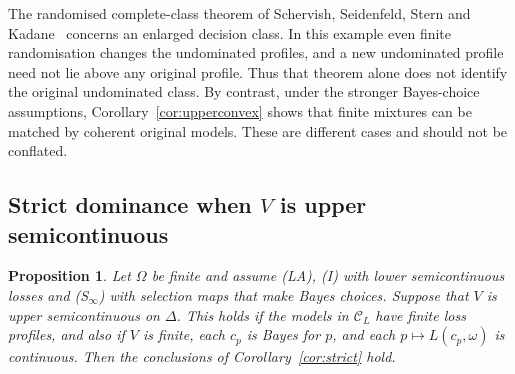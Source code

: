 \documentclass[11pt]{article}
\newtheorem{proposition}[theorem]{Proposition}
\theoremstyle{definition}
\theoremstyle{remark}
\newcommand{\C}{\mathcal C}
\begin{document}
The randomised complete-class theorem of Schervish, Seidenfeld, Stern and Kadane~\cite[Theorem~1]{SSSK} concerns an enlarged decision class. In this example even finite randomisation changes the undominated profiles, and a new undominated profile need not lie above any original profile. Thus that theorem alone does not identify the original undominated class. By contrast, under the stronger Bayes-choice assumptions, Corollary~\ref{cor:upperconvex} shows that finite mixtures can be matched by coherent original models. These are different cases and should not be conflated.

\subsection{Strict dominance when $V$ is upper semicontinuous}\label{sec:strictproof}
\begin{proposition}\label{prop:strict-general}
Let $\Omega$ be finite and assume (LA), (I) with lower semicontinuous losses and (S$_\infty$) with selection maps that make Bayes choices. Suppose that $V$ is upper semicontinuous on $\Delta$. This holds if the models in $\C_L$ have finite loss profiles, and also if $V$ is finite, each $c_p$ is Bayes for $p$, and each $p\mapsto L(c_p,\omega)$ is continuous. Then the conclusions of Corollary~\ref{cor:strict} hold.
\end{proposition}
\end{document}

